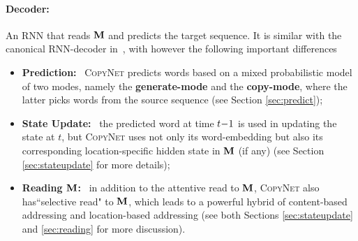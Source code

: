 \paragraph{Decoder:}  An RNN that reads $\mathbf{M}$ 
and predicts the target sequence. It is similar with the canonical RNN-decoder in~\cite{bahdanau2014neural}, with however the following important differences 
\begin{itemize}
	\vspace{-5pt}
    \item {\bf Prediction:}~ \textsc{CopyNet} predicts words based on a mixed probabilistic model of two modes, namely the \textbf{generate-mode} and the \textbf{copy-mode}, where the latter picks words from the source sequence (see Section \ref{sec:predict});
	\vspace{-5pt}
	\item {\bf  State Update:}~ the predicted word at time $t\hspace{-2pt}-\hspace{-2pt}1$ is used in updating the state at $t$, but \textsc{CopyNet} uses not only its word-embedding but also its corresponding location-specific hidden state in $\mathbf{M}$ (if any) (see Section \ref{sec:stateupdate} for more details);
	\vspace{-5pt}
	\item {\bf Reading $\mathbf{M}$:}~ in addition to the attentive read to $\mathbf{M}$, \textsc{CopyNet} also has``selective read" to $\mathbf{M}$, which leads to a powerful hybrid of content-based addressing and location-based addressing (see both Sections \ref{sec:stateupdate} and \ref{sec:reading} for more discussion).
	\vspace{-5pt}
\end{itemize}


